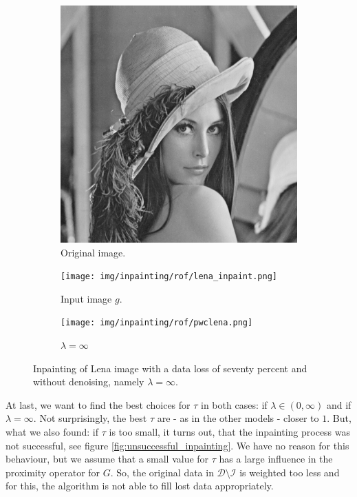 \documentclass{scrreprt}
\begin{document}
        \begin{figure}[!ht]
            \centering
            \begin{subfigure}[b]{0.30\textwidth}
                \includegraphics[width=\textwidth]{img/images/lena.png}
                \caption{Original image.}
            \end{subfigure}
            \begin{subfigure}[b]{0.30\textwidth}
                \texttt{[image: img/inpainting/rof/lena\_inpaint.png]}
                \caption{Input image $g$.}
            \end{subfigure}
            \begin{subfigure}[b]{0.30\textwidth}
                \texttt{[image: img/inpainting/rof/pwclena.png]}
                \caption{$\lambda = \infty$}
            \end{subfigure}
            \caption[Inpainting with seventy percent data loss without denoising.]{Inpainting of Lena image with a data loss of seventy percent and without denoising, namely $\lambda = \infty$.}
        \label{fig:inpainting_lena_rof_pwc}
        \end{figure}

        At last, we want to find the best choices for $\tau$ in both cases: if $\lambda \in (0, \infty)$ and if $\lambda = \infty$. Not surprisingly, the best $\tau$ are - as in the other models - closer to $1$. But, what we also found: if $\tau$ is too small, it turns out, that the inpainting process was not successful, see figure \ref{fig:unsuccessful_inpainting}. We have no reason for this behaviour, but we assume that a small value for $\tau$ has a large influence in the proximity operator for $G$. So, the original data in $\mathcal{D} \setminus \mathcal{I}$ is weighted too less and for this, the algorithm is not able to fill lost data appropriately.
\end{document}

